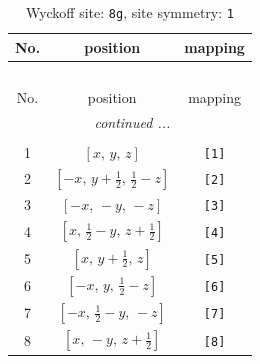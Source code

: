 \documentclass[fleqn,8pt]{jsarticle}
\begin{document}
\renewcommand{\arraystretch}{1.2}
\begin{longtable}{ccc}
\caption{Wyckoff site: {\tt 8g}, site symmetry: {\tt 1}}
 \\
 \hline \hline
No. & position & mapping \\ \hline \endfirsthead

\multicolumn{2}{l}{\tablename\ \thetable{}} \\
 \hline \hline
No. & position & mapping \\ \hline \endhead

 \hline \hline
\multicolumn{2}{r}{\footnotesize\it continued ...} \\ \endfoot

 \hline \hline
\multicolumn{2}{r}{} \\ \endlastfoot

1 & $\left[ x,\, y,\, z \right]$ & {\tt [1]} \\ \hline
2 & $\left[ - x,\, y + \frac{1}{2},\, \frac{1}{2} - z \right]$ & {\tt [2]} \\ \hline
3 & $\left[ - x,\, - y,\, - z \right]$ & {\tt [3]} \\ \hline
4 & $\left[ x,\, \frac{1}{2} - y,\, z + \frac{1}{2} \right]$ & {\tt [4]} \\ \hline
5 & $\left[ x,\, y + \frac{1}{2},\, z \right]$ & {\tt [5]} \\ \hline
6 & $\left[ - x,\, y,\, \frac{1}{2} - z \right]$ & {\tt [6]} \\ \hline
7 & $\left[ - x,\, \frac{1}{2} - y,\, - z \right]$ & {\tt [7]} \\ \hline
8 & $\left[ x,\, - y,\, z + \frac{1}{2} \right]$ & {\tt [8]} \\
\end{longtable}
\end{document}
